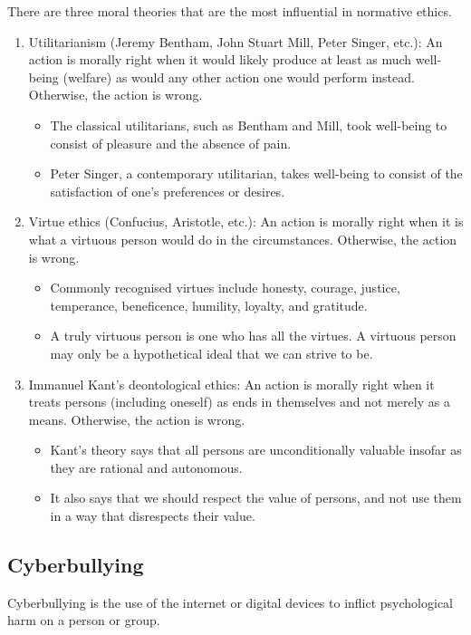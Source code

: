 \documentclass[11pt]{article}
\begin{document}
There are three moral theories that are the most influential in normative ethics.
\begin{enumerate}
\item Utilitarianism (Jeremy Bentham, John Stuart Mill, Peter Singer, etc.): An action is morally right when it would likely produce at least as much well-being (welfare) as would any other action one would perform instead. Otherwise, the action is wrong.
\begin{itemize}
\item The classical utilitarians, such as Bentham and Mill, took well-being to consist of pleasure and the absence of pain.
\item Peter Singer, a contemporary utilitarian, takes well-being to consist of the satisfaction of one's preferences or desires.
\end{itemize}

\item Virtue ethics (Confucius, Aristotle, etc.): An action is morally right when it is what a virtuous person would do in the circumstances. Otherwise, the action is wrong.
\begin{itemize}
\item Commonly recognised virtues include honesty, courage, justice, temperance, beneficence, humility, loyalty, and gratitude.
\item A truly virtuous person is one who has all the virtues. A virtuous person may only be a hypothetical ideal that we can strive to be.
\end{itemize}

\item Immanuel Kant's deontological ethics: An action is morally right when it treats persons (including oneself) as ends in themselves and not merely as a means. Otherwise, the action is wrong.
\begin{itemize}
\item Kant's theory says that all persons are unconditionally valuable insofar as they are rational and autonomous.
\item It also says that we should respect the value of persons, and not use them in a way that disrespects their value.
\end{itemize}
\end{enumerate}

\clearpage
\subsection{Cyberbullying}
\label{sec:org7830fca}
Cyberbullying is the use of the internet or digital devices to inflict psychological harm on a person or group.
\end{document}

